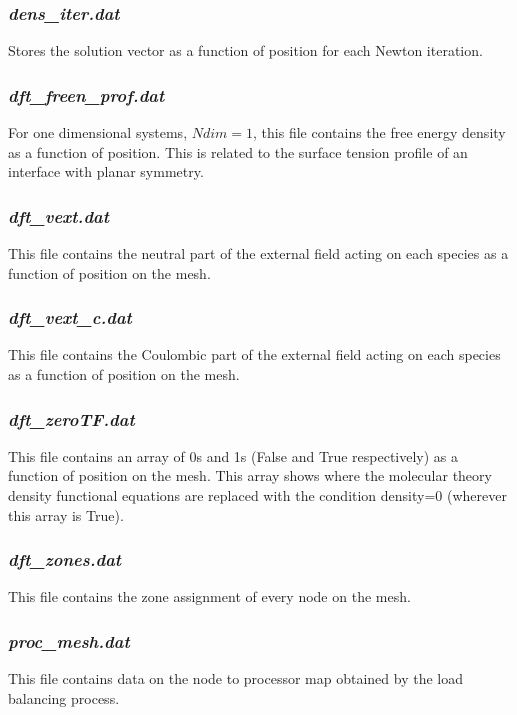 \documentclass[10pt,onecolumn]{article}
\begin{document}
\subsubsection{{\it dens\_iter.dat}} 
Stores the solution vector as a function of position for each Newton iteration.

\subsubsection{{\it dft\_freen\_prof.dat}}
For one dimensional systems, $Ndim=1$, this file contains the free energy density as a function of position.  This is related to the surface tension profile of an interface with planar symmetry.

\subsubsection{{\it dft\_vext.dat}}
This file contains the neutral part of the external field acting on each species
as a function of position on the mesh.

\subsubsection{{\it dft\_vext\_c.dat}}
This file contains the Coulombic part of the external field acting on each species
as a function of position on the mesh.

\subsubsection{{\it dft\_zeroTF.dat}}
This file contains an array of 0s and 1s (False and True respectively) as a function of
position on the mesh.  This array shows where the molecular theory density functional
equations are replaced with the condition density=0 (wherever this array is True).

\subsubsection{{\it dft\_zones.dat}}
This file contains the zone assignment of every node on the mesh.  

\subsubsection{{\it proc\_mesh.dat}}  This file contains data on the node to processor
map obtained by the load balancing process.
\end{document}
